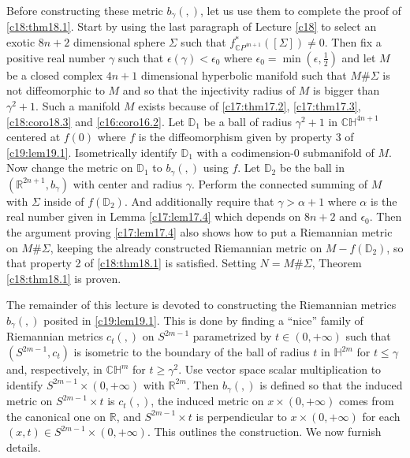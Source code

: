 Before constructing these metric $b_{\gamma}(,)$, let us use them to
complete the proof of \ref{c18:thm18.1}. Start by using the last
paragraph of Lecture \ref{c18} to select an exotic $8n+2$ dimensional
sphere $\Sigma$ such that $f^{*}_{\mathbb{C}P^{4n+1}}([\Sigma])\neq
0$. Then fix a positive real number $\gamma$ such that
$\epsilon(\gamma)<\epsilon_{0}$ where
$\epsilon_{0}=\min(\epsilon,\frac{1}{2})$ and let $M$ be a closed
complex $4n+1$ dimensional hyperbolic manifold such that $M\# \Sigma$
is not diffeomorphic to $M$ and so that the injectivity radius of $M$
is bigger than $\gamma^{2}+1$. Such a manifold $M$ exists because of
\ref{c17:thm17.2}, \ref{c17:thm17.3}, \ref{c18:coro18.3} and
\ref{c16:coro16.2}. Let $\mathbb{D}_{1}$ be a ball of radius
$\gamma^{2}+1$ in $\mathbb{CH}^{4n+1}$ centered at $f(0)$ where $f$ is
the diffeomorphism given by property 3 of
\ref{c19:lem19.1}. Isometrically identify $\mathbb{D}_{1}$ with a
codimension-0 submanifold of $M$. Now change the metric on
$\mathbb{D}_{1}$ to $b_{\gamma}(,)$ using $f$. Let $\mathbb{D}_{2}$ be
the ball in $(\mathbb{R}^{2n+1},b_{\gamma})$ with center and radius $\gamma$. Perform the connected summing of $M$ with
$\Sigma$ inside of $f(\mathbb{D}_{2})$. And additionally require that
$\gamma>\alpha+1$ where $\alpha$ is the real number given in Lemma
\ref{c17:lem17.4} which depends on $8n+2$ and $\epsilon_{0}$. Then the
argument proving \ref{c17:lem17.4} also shows how to put a Riemannian
metric on $M\# \Sigma$, keeping the already constructed Riemannian
metric on $M-f(\mathbb{D}_{2})$, so that property 2 of
\ref{c18:thm18.1} is satisfied. Setting $N=M\# \Sigma$, Theorem
\ref{c18:thm18.1} is proven.

The remainder of this lecture is devoted to constructing the
Riemannian metrics $b_{\gamma}(,)$ posited in \ref{c19:lem19.1}. This
is done by finding a ``nice'' family of Riemannian metrics $c_{t}(,)$
on $S^{2m-1}$ parametrized by $t\in (0,+\infty)$ such that
$(S^{2m-1},c_{t})$ is isometric to the boundary of the ball of radius
$t$ in $\mathbb{H}^{2m}$ for $t\leq \gamma$ and, respectively, in
$\mathbb{CH}^{m}$ for $t\geq \gamma^{2}$. Use vector space scalar
multiplication to identify $S^{2m-1}\times(0,+\infty)$ with
$\mathbb{R}^{2m}$. Then $b_{\gamma}(,)$ is defined so that the induced
metric on $S^{2m-1}\times t$ is $c_{t}(,)$, the induced metric on
$x\times (0,+\infty)$ comes from the canonical one on $\mathbb{R}$,
and $S^{2m-1}\times t$ is perpendicular to $x\times (0,+\infty)$ for
each $(x,t)\in S^{2m-1}\times (0,+\infty)$. This outlines the
construction. We now furnish details.

